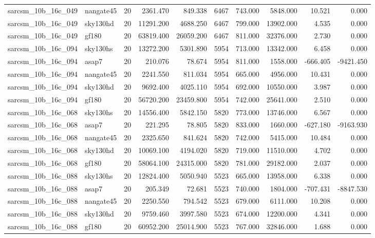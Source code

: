 \begin{longtable}{llrrrrrrrr}
sarcsm\_10b\_16c\_049 & nangate45 & 20 & 2361.470 & 849.338 & 6467 & 743.000 & 5848.000 & 10.521 & 0.000 \\
sarcsm\_10b\_16c\_049 & sky130hd & 20 & 11291.200 & 4688.250 & 6467 & 799.000 & 13902.000 & 4.535 & 0.000 \\
sarcsm\_10b\_16c\_049 & gf180 & 20 & 63819.400 & 26059.200 & 6467 & 811.000 & 32376.000 & 2.730 & 0.000 \\
sarcsm\_10b\_16c\_094 & sky130hs & 20 & 13272.200 & 5301.890 & 5954 & 713.000 & 13342.000 & 6.458 & 0.000 \\
sarcsm\_10b\_16c\_094 & asap7 & 20 & 210.076 & 78.674 & 5954 & 811.000 & 1558.000 & -666.405 & -9421.450 \\
sarcsm\_10b\_16c\_094 & nangate45 & 20 & 2241.550 & 811.034 & 5954 & 665.000 & 4956.000 & 10.431 & 0.000 \\
sarcsm\_10b\_16c\_094 & sky130hd & 20 & 9692.400 & 4025.110 & 5954 & 692.000 & 10550.000 & 3.987 & 0.000 \\
sarcsm\_10b\_16c\_094 & gf180 & 20 & 56720.200 & 23459.800 & 5954 & 742.000 & 25641.000 & 2.510 & 0.000 \\
sarcsm\_10b\_16c\_068 & sky130hs & 20 & 14556.400 & 5842.150 & 5820 & 773.000 & 13746.000 & 6.567 & 0.000 \\
sarcsm\_10b\_16c\_068 & asap7 & 20 & 221.295 & 78.805 & 5820 & 833.000 & 1660.000 & -627.180 & -9163.930 \\
sarcsm\_10b\_16c\_068 & nangate45 & 20 & 2325.650 & 841.624 & 5820 & 742.000 & 5415.000 & 10.484 & 0.000 \\
sarcsm\_10b\_16c\_068 & sky130hd & 20 & 10069.100 & 4194.020 & 5820 & 719.000 & 11510.000 & 4.702 & 0.000 \\
sarcsm\_10b\_16c\_068 & gf180 & 20 & 58064.100 & 24315.000 & 5820 & 781.000 & 29182.000 & 2.037 & 0.000 \\
sarcsm\_10b\_16c\_088 & sky130hs & 20 & 12824.400 & 5050.940 & 5523 & 665.000 & 13958.000 & 6.338 & 0.000 \\
sarcsm\_10b\_16c\_088 & asap7 & 20 & 205.349 & 72.681 & 5523 & 740.000 & 1804.000 & -707.431 & -8847.530 \\
sarcsm\_10b\_16c\_088 & nangate45 & 20 & 2250.550 & 794.542 & 5523 & 679.000 & 6111.000 & 10.208 & 0.000 \\
sarcsm\_10b\_16c\_088 & sky130hd & 20 & 9759.460 & 3997.580 & 5523 & 674.000 & 12200.000 & 4.341 & 0.000 \\
sarcsm\_10b\_16c\_088 & gf180 & 20 & 60952.200 & 25014.900 & 5523 & 767.000 & 32846.000 & 1.688 & 0.000 \\

\end{longtable}
